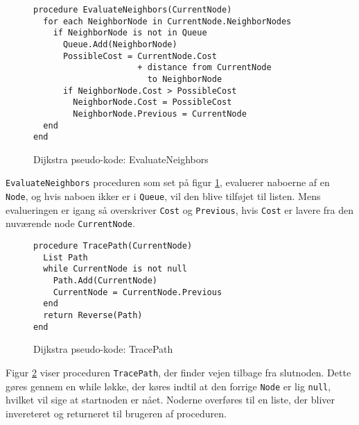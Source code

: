 \begin{figure}[H]
\begin{lstlisting}
procedure EvaluateNeighbors(CurrentNode)
  for each NeighborNode in CurrentNode.NeighborNodes
    if NeighborNode is not in Queue
      Queue.Add(NeighborNode)
      PossibleCost = CurrentNode.Cost 
                     + distance from CurrentNode
                       to NeighborNode
      if NeighborNode.Cost > PossibleCost
        NeighborNode.Cost = PossibleCost
        NeighborNode.Previous = CurrentNode
  end
end
\end{lstlisting}
\caption{Dijkstra pseudo-kode: EvaluateNeighbors}\label{DijkstraCodeEvaluateNeighbors}
\end{figure}

\texttt{EvaluateNeighbors} proceduren som set på figur \ref{DijkstraCodeEvaluateNeighbors}, evaluerer naboerne af en \texttt{Node}, og hvis naboen ikker er i \texttt{Queue}, vil den blive tilføjet til listen. Mens evalueringen er igang så overskriver \texttt{Cost} og \texttt{Previous}, hvis \texttt{Cost} er lavere fra den nuværende node \texttt{CurrentNode}. 

\begin{figure}[H]
\begin{lstlisting}
procedure TracePath(CurrentNode)
  List Path
  while CurrentNode is not null
    Path.Add(CurrentNode)
    CurrentNode = CurrentNode.Previous
  end
  return Reverse(Path)
end
\end{lstlisting}
\caption{Dijkstra pseudo-kode: TracePath}\label{DijkstraCodeTracePath}
\end{figure}

Figur \ref{DijkstraCodeTracePath} viser proceduren \texttt{TracePath}, der finder vejen tilbage fra slutnoden. Dette gøres gennem en while løkke, der køres indtil at den forrige \texttt{Node} er lig \texttt{null}, hvilket vil sige at startnoden er nået. Noderne overføres til en liste, der bliver invereteret og returneret til brugeren af proceduren.